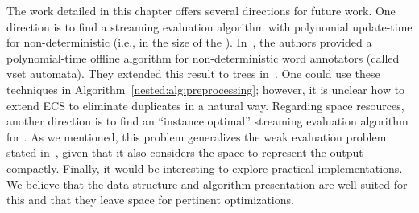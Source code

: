
The work detailed in this chapter offers several directions for future work. One direction is to find a streaming evaluation algorithm with polynomial update-time for non-deterministic \vpann (i.e., in the size of the \vpann). In~\cite{AmarilliBMN19}, the authors provided a polynomial-time offline algorithm for non-deterministic word annotators (called vset automata). 
They extended this result to trees in~\cite{AmarilliBMN19pods}. One could use these techniques in Algorithm~\ref{nested:alg:preprocessing}; however, it is unclear how to extend ECS to eliminate duplicates in a natural way. 
Regarding space resources, another direction is to find an ``instance optimal'' streaming evaluation algorithm for \vpann. 
As we mentioned, this problem generalizes the weak evaluation problem stated in~\cite{SegoufinV02}, given that it also considers the space to represent the output compactly. Finally, it would be interesting to explore practical implementations. 
We believe that the data structure and algorithm presentation are well-suited for this and that they leave space for pertinent optimizations.


